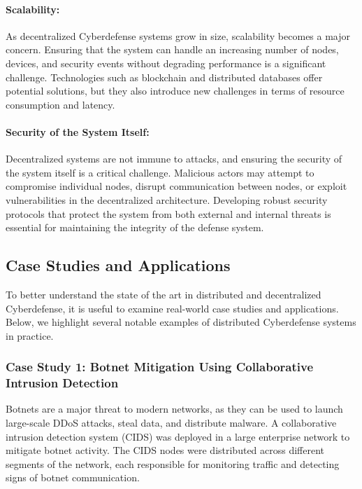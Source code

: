 \paragraph{Scalability:}
As decentralized Cyberdefense systems grow in size, scalability becomes a major concern. Ensuring that the system can handle an increasing number of nodes, devices, and security events without degrading performance is a significant challenge. Technologies such as blockchain and distributed databases offer potential solutions, but they also introduce new challenges in terms of resource consumption and latency.

\paragraph{Security of the System Itself:}
Decentralized systems are not immune to attacks, and ensuring the security of the system itself is a critical challenge. Malicious actors may attempt to compromise individual nodes, disrupt communication between nodes, or exploit vulnerabilities in the decentralized architecture. Developing robust security protocols that protect the system from both external and internal threats is essential for maintaining the integrity of the defense system.

\subsection{Case Studies and Applications}

To better understand the state of the art in distributed and decentralized Cyberdefense, it is useful to examine real-world case studies and applications. Below, we highlight several notable examples of distributed Cyberdefense systems in practice.

\subsubsection{Case Study 1: Botnet Mitigation Using Collaborative Intrusion Detection}

Botnets are a major threat to modern networks, as they can be used to launch large-scale DDoS attacks, steal data, and distribute malware. A collaborative intrusion detection system (CIDS) was deployed in a large enterprise network to mitigate botnet activity. The CIDS nodes were distributed across different segments of the network, each responsible for monitoring traffic and detecting signs of botnet communication.

